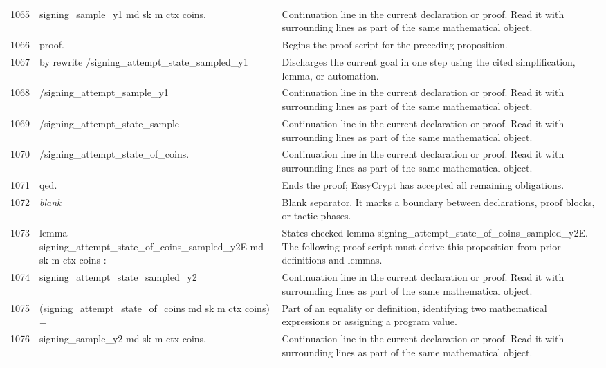 \documentclass[10pt]{article}
\begin{document}
\begin{longtable}{r L{0.53\textwidth} L{0.37\textwidth}}
1065 & {\ttfamily\scriptsize   signing\_sample\_y1 md sk m ctx coins.} & Continuation line in the current declaration or proof.  Read it with surrounding lines as part of the same mathematical object. \\
1066 & {\ttfamily\scriptsize proof.} & Begins the proof script for the preceding proposition. \\
1067 & {\ttfamily\scriptsize by rewrite /signing\_attempt\_state\_sampled\_y1} & Discharges the current goal in one step using the cited simplification, lemma, or automation. \\
1068 & {\ttfamily\scriptsize            /signing\_attempt\_sample\_y1} & Continuation line in the current declaration or proof.  Read it with surrounding lines as part of the same mathematical object. \\
1069 & {\ttfamily\scriptsize            /signing\_attempt\_state\_sample} & Continuation line in the current declaration or proof.  Read it with surrounding lines as part of the same mathematical object. \\
1070 & {\ttfamily\scriptsize            /signing\_attempt\_state\_of\_coins.} & Continuation line in the current declaration or proof.  Read it with surrounding lines as part of the same mathematical object. \\
1071 & {\ttfamily\scriptsize qed.} & Ends the proof; EasyCrypt has accepted all remaining obligations. \\
1072 & {\ttfamily\scriptsize \emph{blank}} & Blank separator.  It marks a boundary between declarations, proof blocks, or tactic phases. \\
1073 & {\ttfamily\scriptsize lemma signing\_attempt\_state\_of\_coins\_sampled\_y2E md sk m ctx coins :} & States checked lemma signing\_attempt\_state\_of\_coins\_sampled\_y2E.  The following proof script must derive this proposition from prior definitions and lemmas. \\
1074 & {\ttfamily\scriptsize   signing\_attempt\_state\_sampled\_y2} & Continuation line in the current declaration or proof.  Read it with surrounding lines as part of the same mathematical object. \\
1075 & {\ttfamily\scriptsize     (signing\_attempt\_state\_of\_coins md sk m ctx coins) =} & Part of an equality or definition, identifying two mathematical expressions or assigning a program value. \\
1076 & {\ttfamily\scriptsize   signing\_sample\_y2 md sk m ctx coins.} & Continuation line in the current declaration or proof.  Read it with surrounding lines as part of the same mathematical object. \\

\end{longtable}
\end{document}
